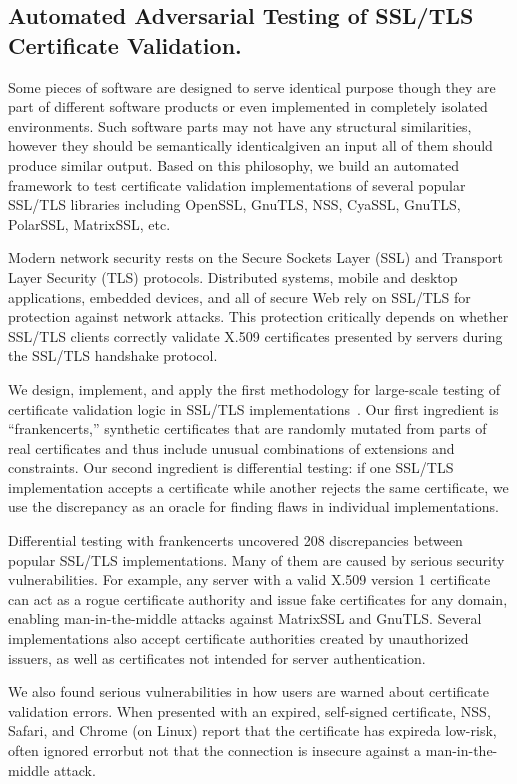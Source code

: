 \documentclass[a4paper, 11pt]{article}
\begin{document}
\begin{small}
\subsection*{\small Automated Adversarial Testing of SSL/TLS Certificate Validation.}

Some pieces of software are designed to serve identical purpose though they are part 
of different software products or even implemented in completely isolated environments. 
Such software parts may not have any structural similarities, however they should be
semantically identical\textemdash given an input all of them should produce similar output.
Based on this philosophy, we build an automated framework to test certificate validation implementations 
of several popular SSL/TLS libraries including OpenSSL, GnuTLS, NSS, CyaSSL, GnuTLS,
PolarSSL, MatrixSSL, etc.
 

Modern network security rests on the Secure Sockets Layer (SSL) and
Transport Layer Security (TLS) protocols.  Distributed systems, mobile
and desktop applications, embedded devices, and all of secure Web rely
on SSL/TLS for protection against network attacks.  This protection
critically depends on whether SSL/TLS clients correctly validate X.509
certificates presented by servers during the SSL/TLS handshake protocol.

We design, implement, and apply the first methodology for large-scale
testing of certificate validation logic in SSL/TLS implementations~\cite{brubaker2014using}.
Our first ingredient is ``frankencerts,'' synthetic certificates that are
randomly mutated from parts of real certificates and thus include unusual
combinations of extensions and constraints.  Our second ingredient is
differential testing: if one SSL/TLS implementation accepts a certificate
while another rejects the same certificate, we use the discrepancy as
an oracle for finding flaws in individual implementations.


Differential testing with frankencerts uncovered 208 discrepancies between
popular SSL/TLS implementations. Many of them are caused by serious security
vulnerabilities.  For example, any server with a valid X.509 version
1 certificate can act as a rogue certificate authority and issue fake
certificates for any domain, enabling man-in-the-middle attacks against
MatrixSSL and GnuTLS.  Several implementations also accept certificate
authorities created by unauthorized issuers, as well as certificates
not intended for server authentication.

We also found serious vulnerabilities in how users are warned about
certificate validation errors.  When presented with an expired,
self-signed certificate, NSS, Safari, and Chrome (on Linux) report
that the certificate has expired\textemdash a low-risk, often ignored
error\textemdash but not that the connection is insecure against a
man-in-the-middle attack.


\end{small}
\end{document}
